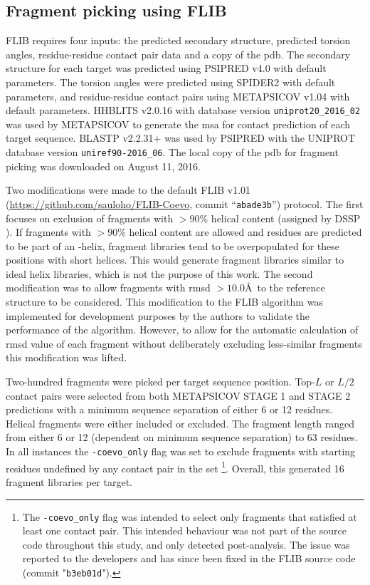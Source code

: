 \subsection{Fragment picking using FLIB}
FLIB \cite{De_Oliveira2015-kb} requires four inputs: the predicted secondary structure, predicted torsion angles, residue-residue contact pair data and a copy of the \gls{pdb}. The secondary structure for each target was predicted using PSIPRED v4.0 \cite{Jones1999-ed} with default parameters. The torsion angles were predicted using SPIDER2 \cite{Heffernan2015-bt} with default parameters, and residue-residue contact pairs using METAPSICOV v1.04 \cite{Jones2015-vq} with default parameters. HHBLITS v2.0.16 \cite{Remmert2011-kt} with database version \texttt{uniprot20\_2016\_02} was used by METAPSICOV to generate the \gls{msa} for contact prediction of each target sequence. BLASTP v2.2.31+ \cite{Altschul1990-og,Camacho2009-th} was used by PSIPRED with the UNIPROT database version \texttt{uniref90-2016\_06}. The local copy of the \gls{pdb} for fragment picking was downloaded on August 11, 2016.

Two modifications were made to the default FLIB v1.01 (\url{https://github.com/sauloho/FLIB-Coevo}, commit “\texttt{abade3b}”) protocol. The first focuses on exclusion of fragments with $>90$\% helical content (assigned by DSSP \cite{Frishman1995-si}). If fragments with $>90$\% helical content are allowed and residues are predicted to be part of an \textalpha-helix, fragment libraries tend to be overpopulated for these positions with short helices. This would generate fragment libraries similar to ideal helix libraries, which is not the purpose of this work. The second modification was to allow fragments with \gls{rmsd} $>10.0$\AA\ to the reference structure to be considered. This modification to the FLIB algorithm was implemented for development purposes by the authors to validate the performance of the algorithm. However, to allow for the automatic calculation of \gls{rmsd} value of each fragment without deliberately excluding less-similar fragments this modification was lifted.

Two-hundred fragments were picked per target sequence position. Top-$L$ or $L/2$ contact pairs were selected from both METAPSICOV STAGE 1 and STAGE 2 predictions with a minimum sequence separation of either 6 or 12 residues. Helical fragments were either included or excluded. The fragment length ranged from either 6 or 12 (dependent on minimum sequence separation) to 63 residues. In all instances the \texttt{-coevo\_only} flag was set to exclude fragments with starting residues undefined by any contact pair in the set \footnote{The \texttt{-coevo\_only} flag was intended to select only fragments that satisfied at least one contact pair. This intended behaviour was not part of the source code throughout this study, and only detected post-analysis. The issue was reported to the developers and has since been fixed in the FLIB source code (commit "\texttt{b3eb01d}").}. Overall, this generated 16 fragment libraries per target.

